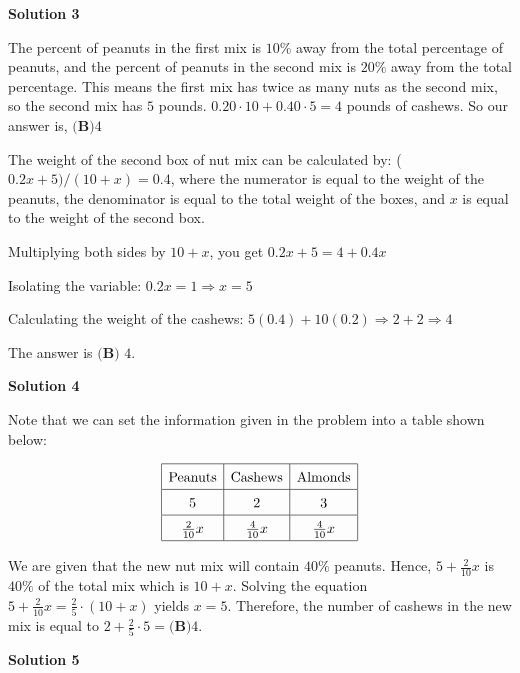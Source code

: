 \begin{enumerate}
 



\textbf{Solution 3}

The percent of peanuts in the first mix is $10\%$ away from the total percentage of peanuts, and the percent of peanuts in the second mix is $20\%$ away from the total percentage. This means the first mix has twice as many nuts as the second mix, so the second mix has $5$ pounds. $0.20 \cdot 10 + 0.40 \cdot 5 = 4$ pounds of cashews. So our answer is, $\boxed{\textbf{(B)}4}$

 The weight of the second box of nut mix can be calculated by: ($0.2x + 5) / (10 + x) = 0.4$, where the numerator is equal to the weight of the peanuts, the denominator is equal to the total weight of the boxes, and $x$ is equal to the weight of the second box.

 Multiplying both sides by $10 + x$, you get $0.2x + 5 = 4 + 0.4x$

 Isolating the variable: $0.2x = 1$$\Rightarrow x = 5$

 Calculating the weight of the cashews: $5(0.4) + 10(0.2)$$\Rightarrow 2 + 2$$\Rightarrow 4$

 The answer is $\boxed{\textbf{(B) } 4}$.

 



\textbf{Solution 4}

Note that we can set the information given in the problem into a table shown below:

 
 \[\renewcommand{\arraystretch}{1.5} \begin{centering} \begin{array}{| c | c | c |} \hline \text{Peanuts} & \text{Cashews} & \text{Almonds}\\ \hline 5 & 2 & 3\\ \hline \frac{2}{10}x & \frac{4}{10}x & \frac{4}{10}x\\ \hline \end{array} \end{centering}\]

 We are given that the new nut mix will contain $40\%$ peanuts. Hence, $5 + \frac{2}{10}x$ is $40\%$ of the total mix which is $10 + x$. Solving the equation $5 + \frac{2}{10}x = \frac{2}{5} \cdot (10 + x)$ yields $x=5.$ Therefore, the number of cashews in the new mix is equal to $2 + \frac{2}{5} \cdot 5 = \boxed{\textbf{(B)}  4}$.

 



\textbf{Solution 5}


\end{enumerate}

